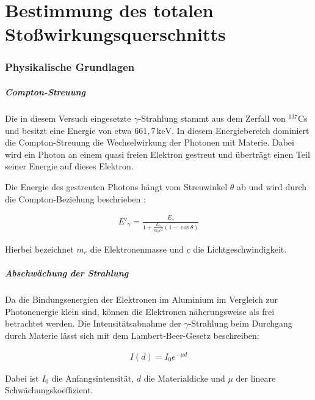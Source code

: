 \chapter{Bestimmung des totalen Stoßwirkungsquerschnitts}

\subsection{Physikalische Grundlagen}

\paragraph{Compton-Streuung}

Die in diesem Versuch eingesetzte $\gamma$-Strahlung stammt aus dem Zerfall von $^{137}$Cs und besitzt eine Energie von etwa $661{,}7\,\mathrm{keV}$. 
In diesem Energiebereich dominiert die Compton-Streuung die Wechselwirkung der Photonen mit Materie. 
Dabei wird ein Photon an einem quasi freien Elektron gestreut und überträgt einen Teil seiner Energie auf dieses Elektron.

Die Energie des gestreuten Photons hängt vom Streuwinkel $\theta$ ab und wird durch die Compton-Beziehung beschrieben \cite{Wermes}:

\begin{align}
    E'_\gamma = \frac{E_\gamma}
    {1+\frac{E_\gamma}{m_e c^2}(1-\cos\theta)}
    \label{eq:compton}
\end{align}

Hierbei bezeichnet $m_e$ die Elektronenmasse und $c$ die Lichtgeschwindigkeit.

\paragraph{Abschwächung der Strahlung}

Da die Bindungsenergien der Elektronen im Aluminium im Vergleich zur Photonenergie klein sind, können die Elektronen näherungsweise als frei betrachtet werden. 
Die Intensitätsabnahme der $\gamma$-Strahlung beim Durchgang durch Materie lässt sich mit dem Lambert-Beer-Gesetz \cite{compton_uzh} beschreiben:

\begin{align}
    I(d)=I_0 e^{-\mu d}
    \label{eq:beer}
\end{align}

Dabei ist $I_0$ die Anfangsintensität, $d$ die Materialdicke und $\mu$ der lineare Schwächungskoeffizient.

